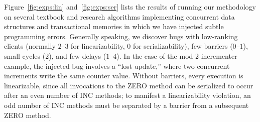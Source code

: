 Figure~\ref{fig:exps:lin} and~\ref{fig:exps:ser} lists the results of running
our methodology on several textbook and research algorithms implementing
concurrent data structures and transactional memories in which we have injected
subtle programming errors. Generally speaking, we discover bugs with
low-ranking clients (normally $2$--$3$ for linearizability, $0$ for
serializability), few barriers ($0$--$1$), small cycles ($2$), and few delays
($1$--$4$). In the case of the mod-2 incrementer example, the injected bug
involves a ``lost update,'' where two concurrent increments write the same
counter value. Without barriers, every execution is linearizable, since all
invocations to the ZERO method can be serialized to occur after an even number
of INC methods; to manifest a linearizability violation, an odd number of INC
methods must be separated by a barrier from a subsequent ZERO method.

